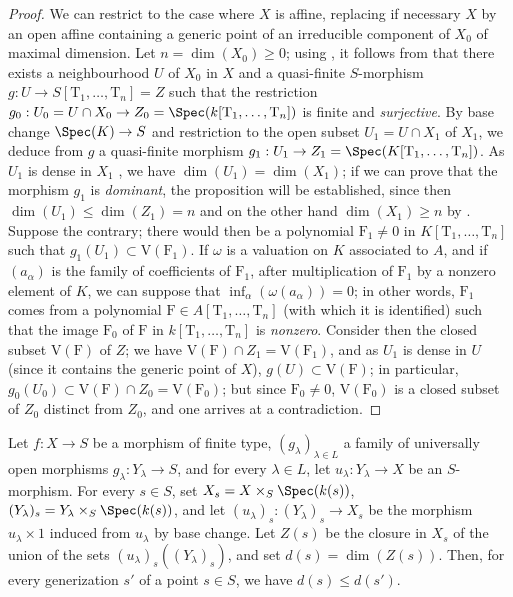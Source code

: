 \begin{proof}
We can restrict to the case where $X$ is affine, replacing if necessary $X$ by an open affine containing a generic point of an irreducible component of $X_0$ of maximal dimension.
Let $n=\dim(X_0)\geq 0$; using , it follows from  that there exists a neighbourhood $U$ of $X_0$ in $X$ and a quasi-finite $S$-morphism $g:U\to S[\mathrm{T}_1,\ldots,\mathrm{T}_n]=Z$ such that the restriction $g_0:U_0=U\cap X_0\to Z_0=\Spec(k[\mathrm{T}_1,\ldots,\mathrm{T}_n])$ is finite and \emph{surjective}.
By base change $\Spec(K)\to S$ and restriction to the open subset $U_1=U\cap X_1$ of $X_1$, we deduce from $g$ a quasi-finite morphism $g_1:U_1\to Z_1=\Spec(K[\mathrm{T}_1,\ldots,\mathrm{T}_n])$.
As $U_1$ is dense in $X_1$ , we have $\dim(U_1)=\dim(X_1)$; if we can prove that the morphism $g_1$ is \emph{dominant}, the proposition will be established, since then $\dim(U_1)\leq\dim(Z_1)=n$ and on the other hand $\dim(X_1)\geq n$ by .
Suppose the contrary; there would then be a polynomial $\mathrm{F}_1\neq 0$ in $K[\mathrm{T}_1,\ldots,\mathrm{T}_n]$ such that $g_1(U_1)\subset\mathrm{V}(\mathrm{F}_1)$.
If $\omega$ is a valuation on $K$ associated to $A$, and if $(a_\alpha)$ is the family of coefficients of $\mathrm{F}_1$, after multiplication of $\mathrm{F}_1$ by a nonzero element of $K$, we can suppose that $\inf_\alpha(\omega(a_\alpha))=0$; in other words, $\mathrm{F}_1$ comes from a polynomial $\mathrm{F}\in A[\mathrm{T}_1,\ldots,\mathrm{T}_n]$ (with which it is identified) such that the image $\mathrm{F}_0$ of $\mathrm{F}$ in $k[\mathrm{T}_1,\ldots,\mathrm{T}_n]$ is \emph{nonzero}.
Consider then the closed subset $\mathrm{V}(\mathrm{F})$ of $Z$; we have $\mathrm{V}(\mathrm{F})\cap Z_1=\mathrm{V}(\mathrm{F}_1)$, and as $U_1$
is dense in $U$ (since it contains the generic point of $X$), $g(U)\subset\mathrm{V}(\mathrm{F})$; in particular, $g_0(U_0)\subset\mathrm{V}(\mathrm{F})\cap Z_0=\mathrm{V}(\mathrm{F}_0)$; but since $\mathrm{F}_0\neq 0$, $\mathrm{V}(\mathrm{F}_0)$ is a closed subset of $Z_0$ distinct from $Z_0$, and one arrives at a contradiction.
\end{proof}

\begin{proposition}[14.3.11]
\label{IV.14.3.11}
Let $f:X\to S$ be a morphism of finite type, $(g_\lambda)_{\lambda\in L}$ a family of universally open morphisms $g_\lambda:Y_\lambda\to S$, and for every $\lambda\in L$, let $u_\lambda:Y_\lambda\to X$ be an $S$-morphism.
For every $s\in S$, set $X_s=X\times_S\Spec(k(s))$, $(Y_\lambda)_s=Y_\lambda\times_S\Spec(k(s))$, and let $(u_\lambda)_s:(Y_\lambda)_s\to X_s$ be the morphism $u_\lambda\times 1$ induced from $u_\lambda$ by base change.
Let $Z(s)$ be the closure in $X_s$ of the union of the sets $(u_\lambda)_s((Y_\lambda)_s)$, and set $d(s)=\dim(Z(s))$.
Then, for every generization $s'$ of a point $s\in S$, we have $d(s)\leq d(s')$.
\end{proposition}

